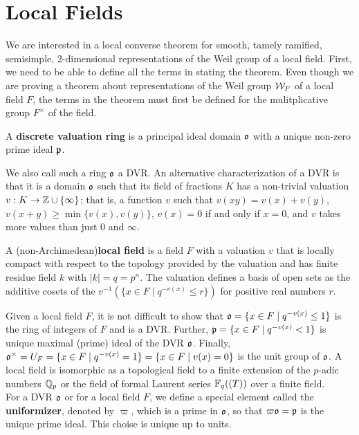 \section{Local Fields}
\label{sec:local-fields}
We are interested in a local converse theorem for smooth, tamely ramified, semisimple, $2$-dimensional representations of the Weil group of a local field.
First, we need to be able to define all the terms in stating the theorem.
Even though we are proving a theorem about representations of the Weil group $\mathcal{W}_F$ of a local field $F$, the terms in the theorem must first be defined for the mulitplicative group $F^\times$ of the field.
\begin{defn}
  A \textbf{discrete valuation ring} is a principal ideal domain $\mathfrak{o}$ with a unique non-zero prime ideal $\mathfrak{p}$.
\end{defn}
We also call such a ring $\mathfrak{o}$ a DVR.
An alternative characterization of a DVR is that it is a domain $\mathfrak{o}$ such that its field of fractions $K$ has a non-trivial valuation $v : K \to \mathbb{Z} \cup \{ \infty \}$; that is, a function $v$ such that $v(xy) = v(x) + v(y)$, $v(x+y) \geq \min \{v(x),v(y)\}$, $v(x) = 0$ if and only if $x = 0$, and $v$ takes more values than just $0$ and $\infty$.
\begin{defn}
  A (non-Archimedean)\textbf{local field} is a field $F$ with a valuation $v$ that is locally compact with respect to the topology provided by the valuation and has finite residue field $k$ with $|k| = q = p^n$.
  The valuation defines a basis of open sets as the additive cosets of the $v^{-1}(\{x \in F \mid q^{-v(x)} \leq r\})$ for positive real numbers $r$.
\end{defn}
Given a local field $F$, it is not difficult to show that $\mathfrak{o} = \{x \in F \mid q^{-v(x)} \leq 1\}$ is the ring of integers of $F$ and is a DVR.
Further, $\mathfrak{p} = \{x \in F \mid q^{-v(x)} < 1\}$ is unique maximal (prime) ideal of the DVR $\mathfrak{o}$.
Finally, $\mathfrak{o}^\times = U_F = \{x \in F \mid q^{-v(x)} = 1\} = \{x \in F \mid v(x) = 0\}$ is the unit group of $\mathfrak{o}$.
A local field is isomorphic as a topological field to a finite extension of the $p$-adic numbers $\mathbb{Q}_p$ or the field of formal Laurent series $\mathbb{F}_q((T))$ over a finite field.
\\

For a DVR $\mathfrak{o}$ or for a local field $F$, we define a special element called the \textbf{uniformizer}, denoted by $\varpi$, which is a prime in $\mathfrak{o}$, so that $\varpi \mathfrak{o} = \mathfrak{p}$ is the unique prime ideal.
This choise is unique up to units.

